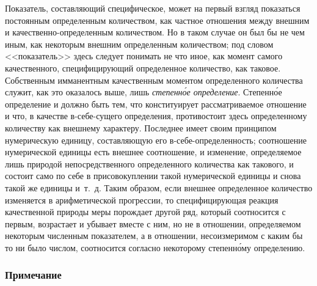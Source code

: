 Показатель, составляющий специфическое, может на первый взгляд показаться
постоянным определенным количеством, как частное отношения между внешним и
качественно-определенным количеством. Но в таком случае он был бы не чем
иным, как некоторым внешним определенным количеством; под словом
<<показатель>> здесь следует понимать не что иное, как момент самого
качественного, специфицирующий определенное количество, как таковое.
Собственным имманентным качественным моментом определенного количества
служит, как это оказалось выше, лишь {\em степенн\'{о}е
определение}. Степенн\'{о}е определение и должно быть тем, что конституирует
рассматриваемое отношение и что, в качестве в-себе-сущего определения,
противостоит здесь определенному количеству как внешнему характеру.
Последнее имеет своим принципом нумерическую единицу, составляющую его
в-себе-определенность; соотношение нумерической единицы есть внешнее
соотношение, и изменение, определяемое лишь природой непосредственного
определенного количества как такового, и состоит само по себе в
присовокуплении такой нумерической единицы и снова такой же единицы и~т.~д.
Таким образом, если внешнее определенное количество изменяется в
арифметической прогрессии, то специфицирующая реакция качественной природы
меры порождает другой ряд, который соотносится с первым, возрастает и
убывает вместе с ним, но не в отношении, определяемом некоторым численным
показателем, а в отношении, несоизмеримом с каким бы то ни было числом,
соотносится согласно некоторому степенн\'{о}му определению.


\subsubsection[Примечание]{Примечание}


